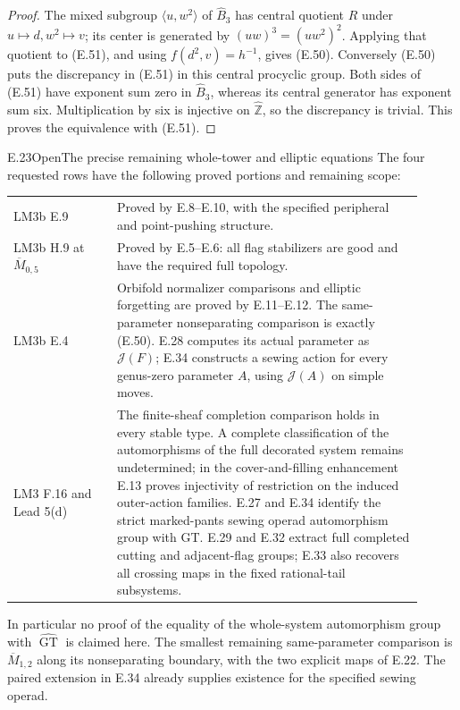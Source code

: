 \begin{proof}
The mixed subgroup $\langle u,w^2\rangle$ of
$\widehat B_3$ has central quotient $R$ under
$u\mapsto d,w^2\mapsto v$; its center is generated
by $(uw)^3=(uw^2)^2$.  Applying that quotient to
(E.51), and using $f(d^2,v)=h^{-1}$, gives (E.50).
Conversely (E.50) puts the discrepancy in (E.51)
in this central procyclic group.  Both sides of
(E.51) have exponent sum zero in $\widehat B_3$,
whereas its central generator has exponent sum six.
Multiplication by six is injective on
$\widehat{\mathbb Z}$, so the discrepancy is trivial.
This proves the equivalence with (E.51).
\end{proof}

\begin{result}{E.23}{Open}{The precise remaining whole-tower and elliptic equations}
The four requested rows have the following proved portions
and remaining scope:
\begin{center}
\begin{tabular}{p{0.23\linewidth}|p{0.68\linewidth}}
LM3b E.9 & Proved by E.8--E.10, with the specified
peripheral and point-pushing structure.\\
LM3b H.9 at $\overline M_{0,5}$ & Proved by E.5--E.6:
all flag stabilizers are good and have the required full topology.\\
LM3b E.4 & Orbifold normalizer comparisons and elliptic
forgetting are proved by E.11--E.12. The same-parameter
nonseparating comparison is exactly (E.50).
E.28 computes its actual parameter as $\mathcal J(F)$;
E.34 constructs a sewing action for every genus-zero
parameter $A$, using $\mathcal J(A)$ on simple moves.\\
LM3 F.16 and Lead 5(d) & The finite-sheaf completion
comparison holds in every stable type. A complete classification
of the automorphisms of the full decorated system remains
undetermined; in the cover-and-filling enhancement E.13 proves
injectivity of restriction on the induced outer-action families.
E.27 and E.34 identify the strict marked-pants sewing
operad automorphism group with GT. E.29 and E.32 extract
full completed cutting and adjacent-flag groups; E.33
also recovers all crossing maps in the fixed rational-tail
subsystems.
\end{tabular}
\end{center}
In particular no proof of the equality of the whole-system
automorphism group with $\widehat{\operatorname{GT}}$ is
claimed here. The smallest remaining same-parameter
comparison is $\overline M_{1,2}$ along its nonseparating
boundary, with the two explicit maps of E.22.
The paired extension in E.34 already supplies existence
for the specified sewing operad.
\end{result}
